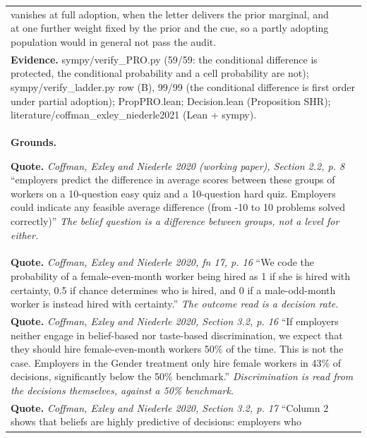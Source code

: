 \documentclass[10pt]{article}
\theoremstyle{definition}
\newlength{\fullw}\setlength{\fullw}{25.9cm}
\begin{document}
{\begin{longtable}{|p{0.9cm}|p{12.2cm}|p{12.2cm}|}
vanishes at full adoption, when the letter delivers the prior marginal, and at one further weight fixed by the prior and the cue, so a partly adopting population would in general not pass the audit.} \\
\multicolumn{3}{|p{\fullw}|}{\textbf{Evidence.} sympy/verify\_PRO.py (59/59: the conditional difference is protected, the conditional probability and a cell probability are not); sympy/verify\_ladder.py row (B), 99/99 (the conditional difference is first order under partial adoption); PropPRO.lean; Decision.lean (Proposition SHR); literature/coffman\_exley\_niederle2021 (Lean + sympy).} \\ \hline
\multicolumn{3}{|p{\fullw}|}{\textbf{Grounds.}\par \textbf{Quote.} \textit{Coffman, Exley and Niederle 2020 (working paper), Section 2.2, p. 8} \newline ``employers predict the difference in average scores between these groups of
workers on a 10-question easy quiz and a 10-question hard quiz. Employers could indicate
any feasible average difference (from -10 to 10 problems solved correctly)'' \newline \textit{The belief question is a difference between groups, not a level for either.}} \\
\multicolumn{3}{|p{\fullw}|}{\textbf{Quote.} \textit{Coffman, Exley and Niederle 2020, fn 17, p. 16} \newline ``We code the probability of a female-even-month worker being hired as 1 if she
is hired with certainty, 0.5 if chance determines who is hired, and 0 if a
male-odd-month worker is instead hired with certainty.'' \newline \textit{The outcome read is a decision rate.}} \\
\multicolumn{3}{|p{\fullw}|}{\textbf{Quote.} \textit{Coffman, Exley and Niederle 2020, Section 3.2, p. 16} \newline ``If employers neither engage in belief-based nor taste-based discrimination, we
expect that they should hire female-even-month workers 50\% of the time. This is not
the case. Employers in the Gender treatment only hire female workers in 43\% of
decisions, significantly below the 50\% benchmark.'' \newline \textit{Discrimination is read from the decisions themselves, against a 50\% benchmark.}} \\
\multicolumn{3}{|p{\fullw}|}{\textbf{Quote.} \textit{Coffman, Exley and Niederle 2020, Section 3.2, p. 17} \newline ``Column 2 shows that beliefs are highly predictive of decisions: employers who
}
\end{longtable}}
\end{document}
